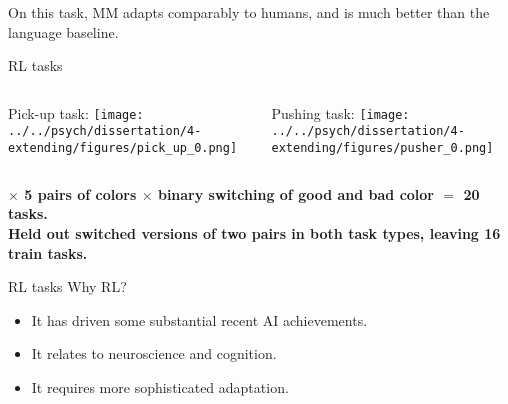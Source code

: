 \documentclass{beamer}
\begin{document}
\begin{frame}[standout]
On this task, MM adapts comparably to humans, and is much better than the language baseline.
\end{frame}

\begin{frame}{RL tasks}
\begin{columns}
\begin{column}{0.5\textwidth}
Pick-up task:
\texttt{[image: ../../psych/dissertation/4-extending/figures/pick\_up\_0.png]}%
\end{column}
\begin{column}{0.5\textwidth}
Pushing task:
\texttt{[image: ../../psych/dissertation/4-extending/figures/pusher\_0.png]}
\end{column}
\end{columns}
\vspace{1em}
{\bf
\(\mathbf{\times}\) 5 pairs of colors \(\mathbf{\times}\) binary switching of good and bad color \(\mathbf{=}\) 20 tasks.\\
Held out switched versions of two pairs in both task types, leaving 16 train tasks.
}
\end{frame}

\begin{frame}{RL tasks}
Why RL? 
\begin{itemize}
\item It has driven some substantial recent AI achievements.
\item It relates to neuroscience and cognition.
\item It requires more sophisticated adaptation. 
\end{itemize}
\end{frame}
\end{document}
